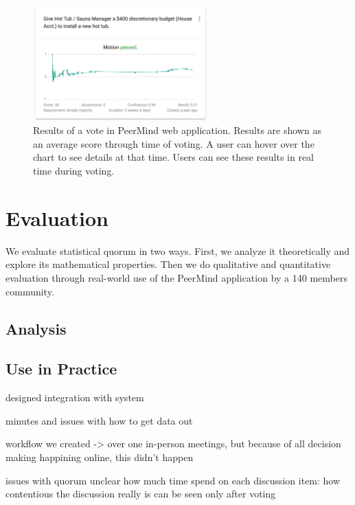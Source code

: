 \documentclass[format=acmsmall, review=true, screen=true, anonymous=true]{acmart}
\begin{document}
\begin{figure}[ht]
\centering
\includegraphics[width=0.6\textwidth]{figures/results.png}
\caption{Results of a vote in PeerMind web application. Results are shown as an average score through time of voting.
A user can hover over the chart to see details at that time. Users can see these results in real time during voting.}
\label{fig:results}
\end{figure}

\section{Evaluation}
\label{sec:evaluation}

We evaluate statistical quorum in two ways. First, we analyze it theoretically and explore its mathematical properties.
Then we do qualitative and quantitative evaluation through real-world use of the PeerMind application by a 140 members
community.

\subsection{Analysis}


\subsection{Use in Practice}

designed integration with system

minutes and issues with how to get data out



workflow we created -> over one in-person meetings, but because of all decision making happining online, this
didn't happen

issues with quorum
unclear how much time spend on each discussion item: how contentious the discussion really is can be seen only after voting
\end{document}
